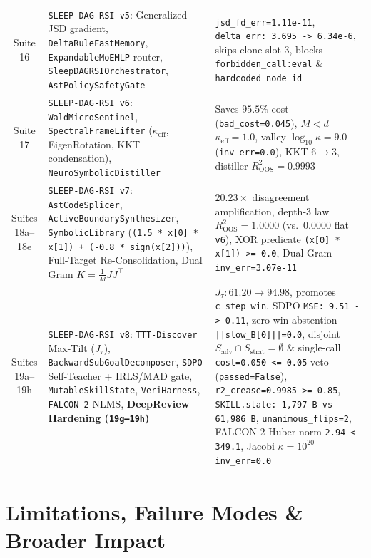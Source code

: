\documentclass[11pt,a4paper]{article}
\begin{document}
\begin{table}[ht!]
\begin{tabular}{cp{6.4cm}p{7.4cm}}
\addlinespace
Suite 16 & \texttt{SLEEP-DAG-RSI v5}: Generalized JSD gradient, \texttt{DeltaRuleFastMemory}, \texttt{ExpandableMoEMLP} router, \texttt{SleepDAGRSIOrchestrator}, \texttt{AstPolicySafetyGate} & \texttt{jsd\_fd\_err=1.11e-11}, \texttt{delta\_err: 3.695 -> 6.34e-6}, skips clone slot $3$, blocks \texttt{forbidden\_call:eval} \& \texttt{hardcoded\_node\_id} \\
\addlinespace
Suite 17 & \texttt{SLEEP-DAG-RSI v6}: \texttt{WaldMicroSentinel}, \texttt{SpectralFrameLifter} ($\kappa_{\text{eff}}$, EigenRotation, KKT condensation), \texttt{NeuroSymbolicDistiller} & Saves $95.5\%$ cost (\texttt{bad\_cost=0.045}), $M<d$ $\kappa_{\text{eff}}=1.0$, valley $\log_{10}\kappa=9.0$ (\texttt{inv\_err=0.0}), KKT $6 \to 3$, distiller $R^2_{\text{OOS}}=0.9993$ \\
\addlinespace
Suites 18a--18e & \texttt{SLEEP-DAG-RSI v7}: \texttt{AstCodeSplicer}, \texttt{ActiveBoundarySynthesizer}, \texttt{SymbolicLibrary} (\texttt{(1.5 * x[0] * x[1]) + (-0.8 * sign(x[2]))}), Full-Target Re-Consolidation, Dual Gram $K = \frac{1}{M}JJ^\top$ & $20.23\times$ disagreement amplification, depth-3 law $R^2_{\text{OOS}}=1.0000$ (vs.\ $0.0000$ flat \texttt{v6}), XOR predicate \texttt{(x[0] * x[1]) >= 0.0}, Dual Gram \texttt{inv\_err=3.07e-11} \\
\addlinespace
Suites 19a--19h & \texttt{SLEEP-DAG-RSI v8}: \texttt{TTT-Discover} Max-Tilt ($J_\tau$), \texttt{BackwardSubGoalDecomposer}, \texttt{SDPO} Self-Teacher + IRLS/MAD gate, \texttt{MutableSkillState}, \texttt{VeriHarness}, \texttt{FALCON-2} NLMS, \textbf{DeepReview Hardening (\texttt{19g--19h})} & $J_\tau: 61.20 \to 94.98$, promotes \texttt{c\_step\_win}, SDPO \texttt{MSE: 9.51 -> 0.11}, zero-win abstention \texttt{||slow\_B[0]||=0.0}, disjoint $S_{\text{adv}} \cap S_{\text{strat}} = \emptyset$ \& single-call \texttt{cost=0.050 <= 0.05} veto (\texttt{passed=False}), \texttt{r2\_crease=0.9985 >= 0.85}, \texttt{SKILL.state: 1,797 B vs 61,986 B}, \texttt{unanimous\_flips=2}, FALCON-2 Huber norm \texttt{2.94 < 349.1}, Jacobi $\kappa=10^{20}$ \texttt{inv\_err=0.0} \\
\bottomrule
\end{tabular}
\end{table}

\section{Limitations, Failure Modes \& Broader Impact}
\end{document}
